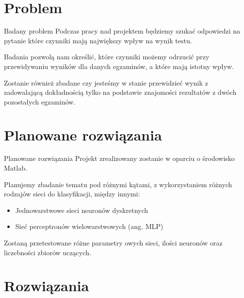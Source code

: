 \documentclass[10pt]{beamer}
\begin{document}
\section{Problem}
 
\begin{frame}{Badany problem}
Podczas pracy nad projektem będziemy szukać odpowiedzi na pytanie które czynniki mają największy wpływ na wynik testu.

Badania pozwolą nam określić, które czynniki możemy odrzucić przy przewidywaniu wyników dla danych egzaminów, a które mają istotny wpływ.

Zostanie również zbadane czy jesteśmy w stanie przewidzieć wynik z zadowalającą dokładnością tylko na podstawie znajomości rezultatów z dwóch pozostałych egzaminów.
 
\end{frame}

\section{Planowane rozwiązania}
 
\begin{frame}{Planowane rozwiązania}
Projekt zrealizowany zostanie w oparciu o środowisko Matlab.

Planujemy zbadanie tematu pod różnymi  kątami, z wykorzystaniem różnych rodzajów sieci do klasyfikacji, między innymi:
\begin{itemize}
\item Jednowarstwowe sieci neuronów dyskretnych
\item Sieć perceptronów wielowarstwowych (ang. MLP)
\end{itemize}

Zostaną przetestowane różne parametry owych sieci, ilości neuronów oraz liczebności zbiorów uczących.

 
\end{frame}

\section{Rozwiązania}
\end{document}
